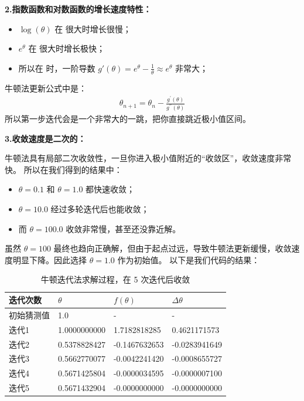 \documentclass{MMCStyle}
\begin{document}
\textbf{2.指数函数和对数函数的增长速度特性：}
\begin{itemize}
    \item $\log(\theta)$ 在 \theta 很大时增长很慢；
    \item $e^\theta$ 在 \theta 很大时增长极快；
    \item 所以在  时，一阶导数 $g'(\theta) = e^\theta - \frac{1}{\theta} \approx e^\theta$ 非常大；
\end{itemize}


  牛顿法更新公式中是：
\begin{eqnarray} \theta_{n+1}=\theta_n-\frac{g^{\prime}(\theta)}{g^{\prime\prime}(\theta)}\end{eqnarray}
所以第一步迭代会是一个非常大的一跳，把你直接跳近极小值区间。


\textbf{3.收敛速度是二次的：}


牛顿法具有局部二次收敛性，一旦你进入极小值附近的“收敛区”，收敛速度非常快。
所以在我们得到的结果中：
\begin{itemize}
    \item $\theta = 0.1$ 和 $\theta = 1.0$ 都快速收敛；
    \item $\theta = 10.0$ 经过多轮迭代后也能收敛；
    \item 而 $\theta = 100.0$ 收敛非常慢，甚至还没靠近解。
\end{itemize}
   
   
   
虽然 $\theta = 100$ 最终也趋向正确解，但由于起点过远，导致牛顿法更新缓慢，收敛速度明显下降。因此选择 $\theta = 1.0$ 作为初始值。
以下是我们代码的结果：

\begin{table}[H]
\centering
\begin{tabular}{|l|l|l|l|}
\hline
迭代次数 & $\theta$ & $f(\theta)$ & $\Delta\theta$ \\ \hline
初始猜测值 & 1.0 & - & - \\ \hline
迭代1 & 1.0000000000 & 1.7182818285 & 0.4621171573 \\ \hline
迭代2 & 0.5378828427 & -0.1467632653 & -0.0283941649 \\ \hline
迭代3 & 0.5662770077 & -0.0042241420 & -0.0008655727 \\ \hline
迭代4 & 0.5671425804 & -0.0000034595 & -0.0000007100 \\ \hline
迭代5 & 0.5671432904 & -0.0000000000 & -0.0000000000 \\ \hline
\end{tabular}
\caption{牛顿迭代法求解过程，在 5 次迭代后收敛}
\label{tab:newton_iteration}
\end{table}
\end{document}
